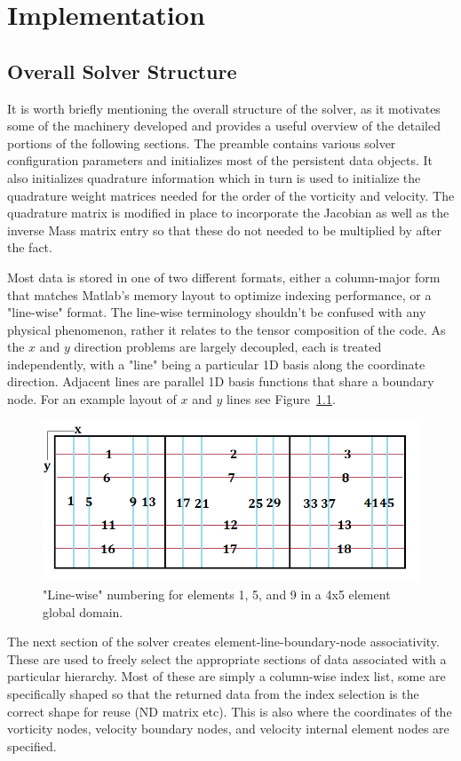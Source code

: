 \documentclass[letterpaper,12pt]{report}
\begin{document}
\chapter{Implementation}
\section{Overall Solver Structure}
It is worth briefly mentioning the overall structure of the solver, as it motivates some of the machinery developed and provides a useful overview of the detailed portions of the following sections. The preamble contains various solver configuration parameters and initializes most of the persistent data objects. It also initializes quadrature information which in turn is used to initialize the quadrature weight matrices needed for the order of the vorticity and velocity. The quadrature matrix is modified in place to incorporate the Jacobian as well as the inverse Mass matrix entry so that these do not needed to be multiplied by after the fact.

Most data is stored in one of two different formats, either a column-major form that matches Matlab's memory layout to optimize indexing performance, or a "line-wise" format. The line-wise terminology shouldn't be confused with any physical phenomenon, rather it relates to the tensor composition of the code. As the $x$ and $y$ direction problems are largely decoupled, each is treated independently, with a "line" being a particular 1D basis along the coordinate direction. Adjacent lines are parallel 1D basis functions that share a boundary node. For an example layout of $x$ and $y$ lines see Figure~\ref{fig:streams}.
\begin{figure}
\centering
\includegraphics[width=5.5in]{streams.PNG}
\caption{\label{fig:streams}"Line-wise" numbering for elements 1, 5, and 9 in a 4x5 element global domain.}
\end{figure}
The next section of the solver creates element-line-boundary-node associativity. These are used to freely select the appropriate sections of data associated with a particular hierarchy. Most of these are simply a column-wise index list, some are specifically shaped so that the returned data from the index selection is the correct shape for reuse (ND matrix etc). This is also where the coordinates of the vorticity nodes, velocity boundary nodes, and velocity internal element nodes are specified. 
\end{document}
